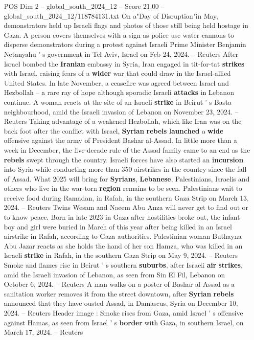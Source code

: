 \begin{textsample}{POS Dim 2 – global\_south\_2024\_12 – Score 21.00 – global\_south\_2024\_12/118784131.txt}
On a"Day of Disruption"in May, demonstrators held up Israeli flags and photos of those still being held hostage in Gaza.
A person covers themselves with a sign as police use water cannons to disperse demonstrators during a protest against Israeli Prime Minister Benjamin Netanyahu ' s government in Tel Aviv, Israel on Feb 24, 2024. -- Reuters After Israel bombed the \textbf{Iranian} embassy in Syria, Iran engaged in tit-for-tat \textbf{strikes} with Israel, raising fears of a \textbf{wider} war that could draw in the Israel-allied United States.
In late November, a ceasefire was agreed between Israel and Hezbollah -- a rare ray of hope although sporadic Israeli \textbf{attacks} in Lebanon continue.
A woman reacts at the site of an Israeli \textbf{strike} in Beirut ' s Basta neighbourhood, amid the Israeli invasion of Lebanon on November 23, 2024. -- Reuters Taking advantage of a weakened Hezbollah, which like Iran was on the back foot after the conflict with Israel, \textbf{Syrian} \textbf{rebels} \textbf{launched} a \textbf{wide} offensive against the army of President Bashar al-Assad.
In little more than a week in December, the five-decade rule of the Assad family came to an end as the \textbf{rebels} swept through the country.
Israeli forces have also started an \textbf{incursion} into Syria while conducting more than 350 airstrikes in the country since the fall of Assad.
What 2025 will bring for \textbf{Syrians}, \textbf{Lebanese}, Palestinians, Israelis and others who live in the war-torn \textbf{region} remains to be seen.
Palestinians wait to receive food during Ramadan, in Rafah, in the southern Gaza Strip on March 13, 2024. -- Reuters Twins Wesam and Naeem Abu Anza will never get to find out or to know peace.
Born in late 2023 in Gaza after hostilities broke out, the infant boy and girl were buried in March of this year after being killed in an Israel airstrike in Rafah, according to Gaza authorities.
Palestinian woman Buthayna Abu Jazar reacts as she holds the hand of her son Hamza, who was killed in an Israeli \textbf{strike} in Rafah, in the southern Gaza Strip on May 9, 2024. -- Reuters Smoke and flames rise in Beirut ' s southern \textbf{suburbs}, after Israeli \textbf{air} \textbf{strikes}, amid the Israeli invasion of Lebanon, as seen from Sin El Fil, Lebanon on October 6, 2024. -- Reuters A man walks on a poster of Bashar al-Assad as a sanitation worker removes it from the street downtown, after \textbf{Syrian} \textbf{rebels} announced that they have ousted Assad, in Damascus, Syria on December 10, 2024. -- Reuters Header image : Smoke rises from Gaza, amid Israel ' s offensive against Hamas, as seen from Israel ' s \textbf{border} with Gaza, in southern Israel, on March 17, 2024. -- Reuters

\end{textsample}
